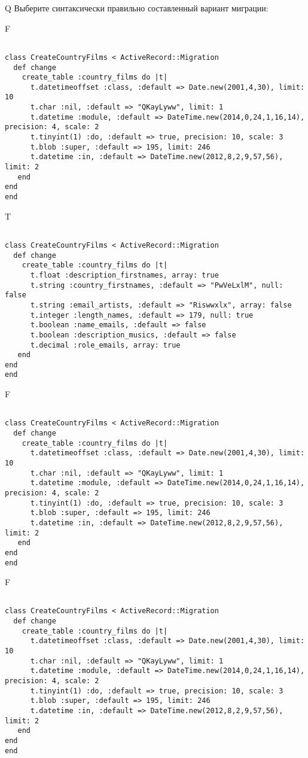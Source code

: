 Q
Выберите синтаксически правильно составленный вариант миграции:

F
\begin{verbatim}
		
class CreateCountryFilms < ActiveRecord::Migration 
  def change 
    create_table :country_films do |t| 
      t.datetimeoffset :class, :default => Date.new(2001,4,30), limit: 10
      t.char :nil, :default => "QKayLyww", limit: 1
      t.datetime :module, :default => DateTime.new(2014,0,24,1,16,14), precision: 4, scale: 2
      t.tinyint(1) :do, :default => true, precision: 10, scale: 3
      t.blob :super, :default => 195, limit: 246
      t.datetime :in, :default => DateTime.new(2012,8,2,9,57,56), limit: 2
   end
end
end
\end{verbatim}

T
\begin{verbatim}
		
class CreateCountryFilms < ActiveRecord::Migration 
  def change 
    create_table :country_films do |t| 
      t.float :description_firstnames, array: true
      t.string :country_firstnames, :default => "PwVeLxlM", null: false
      t.string :email_artists, :default => "Riswwxlx", array: false
      t.integer :length_names, :default => 179, null: true
      t.boolean :name_emails, :default => false
      t.boolean :description_musics, :default => false
      t.decimal :role_emails, array: true
   end
end
end
\end{verbatim}

F
\begin{verbatim}
		
class CreateCountryFilms < ActiveRecord::Migration 
  def change 
    create_table :country_films do |t| 
      t.datetimeoffset :class, :default => Date.new(2001,4,30), limit: 10
      t.char :nil, :default => "QKayLyww", limit: 1
      t.datetime :module, :default => DateTime.new(2014,0,24,1,16,14), precision: 4, scale: 2
      t.tinyint(1) :do, :default => true, precision: 10, scale: 3
      t.blob :super, :default => 195, limit: 246
      t.datetime :in, :default => DateTime.new(2012,8,2,9,57,56), limit: 2
   end
end
end
\end{verbatim}

F
\begin{verbatim}
		
class CreateCountryFilms < ActiveRecord::Migration 
  def change 
    create_table :country_films do |t| 
      t.datetimeoffset :class, :default => Date.new(2001,4,30), limit: 10
      t.char :nil, :default => "QKayLyww", limit: 1
      t.datetime :module, :default => DateTime.new(2014,0,24,1,16,14), precision: 4, scale: 2
      t.tinyint(1) :do, :default => true, precision: 10, scale: 3
      t.blob :super, :default => 195, limit: 246
      t.datetime :in, :default => DateTime.new(2012,8,2,9,57,56), limit: 2
   end
end
end
\end{verbatim}

